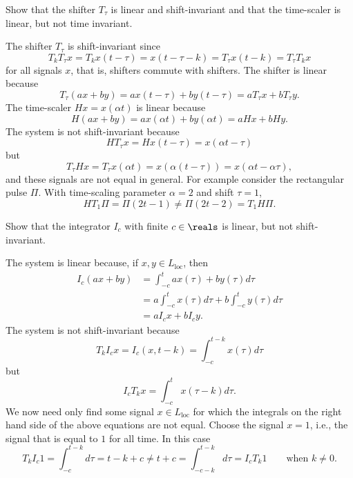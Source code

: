 \begin{excersizelist}
\begin{solution}
\end{solution}


\item Show that the shifter $T_\tau$ is linear and shift-invariant and that the time-scaler is linear, but not time invariant.
\begin{solution}
The shifter $T_\tau$ is shift-invariant since
\[
T_kT_\tau x  = T_kx(t - \tau) = x(t - \tau - k) = T_\tau x(t - k) = T_\tau T_k x 
\]
for all signals $x$, that is, shifters commute with shifters.  The shifter is linear because
\[
T_\tau(ax + by) = ax(t - \tau) + by(t - \tau) = a T_\tau x + b T_\tau y.
\]
The time-scaler $H x = x(\alpha t)$ is linear because
\[
H(ax + by) = ax(\alpha t) + by(\alpha t) = aHx + b Hy.
\]
The system is not shift-invariant because
\[
HT_\tau x = Hx(t-\tau) = x(\alpha t - \tau)
\]
but 
\[
T_\tau H x = T_\tau x(\alpha t) = x(\alpha(t - \tau)) = x( \alpha t - \alpha \tau ),
\]
and these signals are not equal in general.  For example consider the rectangular pulse $\Pi$.  With time-scaling parameter $\alpha = 2$ and shift $\tau = 1$,
\[
H T_1 \Pi = \Pi( 2 t - 1 ) \neq \Pi( 2t - 2 ) = T_1 H \Pi .
\]
\end{solution}


\item \label{exer:Ialineshiftinv} Show that the integrator $I_c$ with finite $c \in \reals$ is linear, but not shift-invariant.
\begin{solution}
The system is linear because, if $x, y \in L_{\text{loc}}$, then
\begin{align*}
I_c(ax + by) &= \int_{-c}^t ax(\tau) + b y(\tau) d\tau \\
&= a\int_{-c}^t x(\tau) d\tau + b \int_{-c}^t y(\tau) d\tau \\
&= a I_c x  + b I_c y.
\end{align*}
The system is not shift-invariant because
\[
T_k I_c x = I_c(x,t-k) = \int_{-c}^{t-k} x(\tau) d\tau 
\]
but
\[
I_c T_k x = \int_{-c}^{t} x(\tau-k) d\tau.
\]
We now need only find some signal $x \in L_{\text{loc}}$ for which the integrals on the right hand side of the above equations are not equal.  Choose the signal $x = 1$, i.e., the signal that is equal to $1$ for all time.  In this case
\[
T_k I_c 1 = \int_{-c}^{t-k} d\tau =  t-k+c \neq t + c = \int_{-c-k}^{t-k} d\tau = I_c T_k 1 \qquad \text{when $k \neq 0$.}
\]
\end{solution}


\end{excersizelist}
